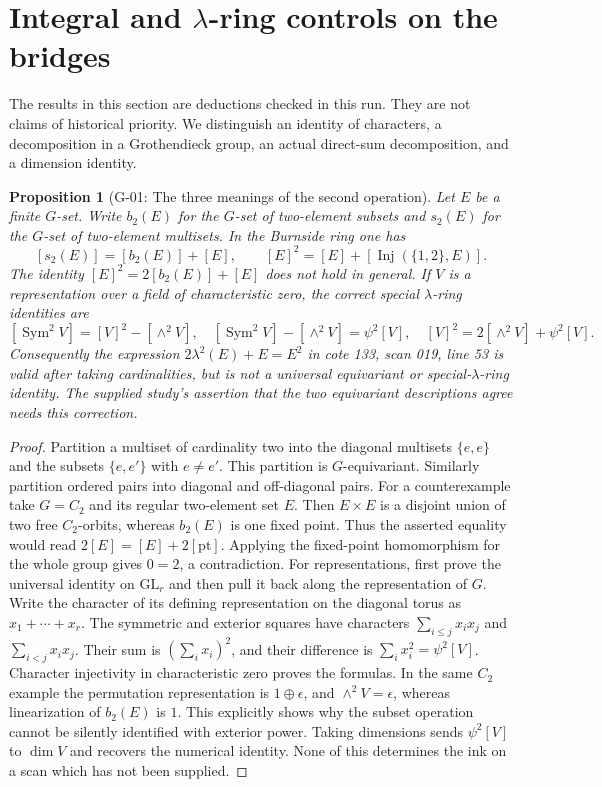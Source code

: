 \documentclass[11pt,a4paper]{article}
\newtheorem{proposition}{Proposition}
\theoremstyle{definition}\newtheorem{definition}{Definition}
\begin{document}

\section{Integral and $\lambda$-ring controls on the bridges}\label{sec:root-findings}
The results in this section are deductions checked in this run. They are not claims of historical priority. We distinguish an identity of characters, a decomposition in a Grothendieck group, an actual direct-sum decomposition, and a dimension identity.

\begin{proposition}[G-01: The three meanings of the second operation]\label{G-01}
Let $E$ be a finite $G$-set. Write $b_2(E)$ for the $G$-set of two-element subsets and $s_2(E)$ for the $G$-set of two-element multisets. In the Burnside ring one has
\[
 [s_2(E)]=[b_2(E)]+[E],\qquad [E]^2=[E]+[\operatorname{Inj}(\{1,2\},E)].
\]
The identity $[E]^2=2[b_2(E)]+[E]$ does not hold in general. If $V$ is a representation over a field of characteristic zero, the correct special $\lambda$-ring identities are
\[
 [\operatorname{Sym}^2V]=[V]^2-[\wedge^2V],\quad
 [\operatorname{Sym}^2V]-[\wedge^2V]=\psi^2[V],\quad
 [V]^2=2[\wedge^2V]+\psi^2[V].
\]
Consequently the expression $2\lambda^2(E)+E=E^2$ in cote 133, scan 019, line 53 is valid after taking cardinalities, but is not a universal equivariant or special-$\lambda$-ring identity. The supplied study's assertion that the two equivariant descriptions agree needs this correction.
\end{proposition}
\begin{proof}
Partition a multiset of cardinality two into the diagonal multisets $\{e,e\}$ and the subsets $\{e,e'\}$ with $e\ne e'$. This partition is $G$-equivariant. Similarly partition ordered pairs into diagonal and off-diagonal pairs. For a counterexample take $G=C_2$ and its regular two-element set $E$. Then $E\times E$ is a disjoint union of two free $C_2$-orbits, whereas $b_2(E)$ is one fixed point. Thus the asserted equality would read $2[E]=[E]+2[\mathrm{pt}]$. Applying the fixed-point homomorphism for the whole group gives $0=2$, a contradiction.
For representations, first prove the universal identity on $\mathrm{GL}_r$ and then pull it back along the representation of $G$. Write the character of its defining representation on the diagonal torus as $x_1+\cdots+x_r$. The symmetric and exterior squares have characters $\sum_{i\leq j}x_ix_j$ and $\sum_{i<j}x_ix_j$. Their sum is $(\sum_i x_i)^2$, and their difference is $\sum_i x_i^2=\psi^2[V]$. Character injectivity in characteristic zero proves the formulas. In the same $C_2$ example the permutation representation is $1\oplus\epsilon$, and $\wedge^2V=\epsilon$, whereas linearization of $b_2(E)$ is $1$. This explicitly shows why the subset operation cannot be silently identified with exterior power. Taking dimensions sends $\psi^2[V]$ to $\dim V$ and recovers the numerical identity. None of this determines the ink on a scan which has not been supplied.
\end{proof}
\end{document}

